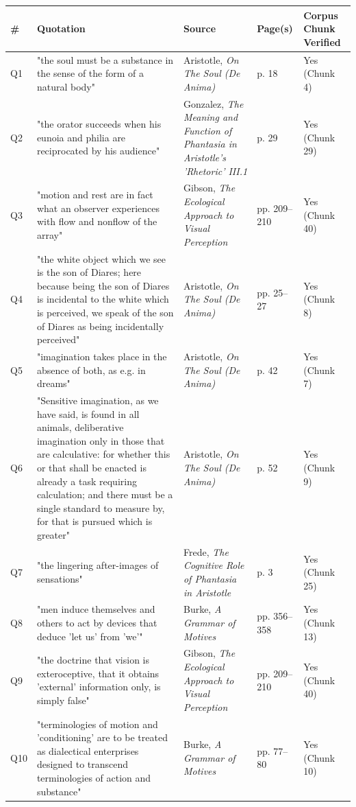 \begin{center}
\footnotesize
\begin{tabular}{|l|l|l|l|l|}
\hline
\textbf{\#} & \textbf{Quotation} & \textbf{Source} & \textbf{Page(s)} & \textbf{Corpus Chunk Verified} \\
\hline
Q1 & "the soul must be a substance in the sense of the form of a natural body" & Aristotle, \textit{On The Soul (De Anima)} & p. 18 & Yes (Chunk 4) \\
\hline
Q2 & "the orator succeeds when his eunoia and philia are reciprocated by his audience" & Gonzalez, \textit{The Meaning and Function of Phantasia in Aristotle's 'Rhetoric' III.1} & p. 29 & Yes (Chunk 29) \\
\hline
Q3 & "motion and rest are in fact what an observer experiences with flow and nonflow of the array" & Gibson, \textit{The Ecological Approach to Visual Perception} & pp. 209--210 & Yes (Chunk 40) \\
\hline
Q4 & "the white object which we see is the son of Diares; here because being the son of Diares is incidental to the white which is perceived, we speak of the son of Diares as being incidentally perceived" & Aristotle, \textit{On The Soul (De Anima)} & pp. 25--27 & Yes (Chunk 8) \\
\hline
Q5 & "imagination takes place in the absence of both, as e.g. in dreams" & Aristotle, \textit{On The Soul (De Anima)} & p. 42 & Yes (Chunk 7) \\
\hline
Q6 & "Sensitive imagination, as we have said, is found in all animals, deliberative imagination only in those that are calculative: for whether this or that shall be enacted is already a task requiring calculation; and there must be a single standard to measure by, for that is pursued which is greater" & Aristotle, \textit{On The Soul (De Anima)} & p. 52 & Yes (Chunk 9) \\
\hline
Q7 & "the lingering after-images of sensations" & Frede, \textit{The Cognitive Role of Phantasia in Aristotle} & p. 3 & Yes (Chunk 25) \\
\hline
Q8 & "men induce themselves and others to act by devices that deduce 'let us' from 'we'" & Burke, \textit{A Grammar of Motives} & pp. 356--358 & Yes (Chunk 13) \\
\hline
Q9 & "the doctrine that vision is exteroceptive, that it obtains 'external' information only, is simply false" & Gibson, \textit{The Ecological Approach to Visual Perception} & pp. 209--210 & Yes (Chunk 40) \\
\hline
Q10 & "terminologies of motion and 'conditioning' are to be treated as dialectical enterprises designed to transcend terminologies of action and substance" & Burke, \textit{A Grammar of Motives} & pp. 77--80 & Yes (Chunk 10) \\
\hline
\end{tabular}
\end{center}

